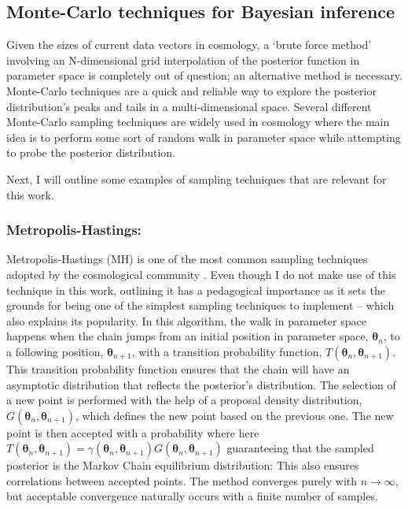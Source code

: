 \subsection{Monte-Carlo techniques for Bayesian inference}\label{Sec:Sampling}
Given the sizes of current data vectors in cosmology, a `brute force method' involving an N-dimensional grid interpolation of the posterior function in parameter space is completely out of question; an alternative method is necessary. Monte-Carlo techniques are a quick and reliable way to explore the posterior distribution's peaks and tails in a multi-dimensional space. Several different Monte-Carlo sampling techniques are widely used in cosmology where the main idea is to perform some sort of random walk in parameter space while attempting to probe the posterior distribution. 

\qquad Next, I will outline some examples of sampling techniques that are relevant for this work.

\subsubsection{Metropolis-Hastings:}
Metropolis-Hastings (MH) is one of the most common sampling techniques adopted by the cosmological community \citep{2002CosmoMC}. Even though I do not make use of this technique in this work, outlining it has a pedagogical importance as it sets the grounds for being one of the simplest sampling techniques to implement -- which also explains its popularity. In this algorithm, the walk in parameter space happens when the chain jumps from an initial position in parameter space, $\bm{\theta}_n$, to a following position, $\bm{\theta}_{n+1}$, with a transition probability function, $T(\bm{\theta}_n,\bm{\theta}_{n+1})$. This transition probability function ensures that the chain will have an asymptotic distribution that reflects the posterior's distribution. The selection of a new point is performed with the help of a proposal density distribution, $G(\bm{\theta}_n, \bm{\theta}_{n+1})$, which defines the new point based on the previous one. The new point is then accepted with a probability
where here $T(\bm{\theta}_n,\bm{\theta}_{n+1}) = \gamma(\bm{\theta}_n, \bm{\theta}_{n+1})G(\bm{\theta}_n, \bm{\theta}_{n+1})$ guaranteeing that the sampled posterior is the Markov Chain equilibrium distribution:
This also ensures correlations between accepted points. The method converges purely with $n\rightarrow \infty$, but acceptable convergence naturally occurs with a finite number of samples.

